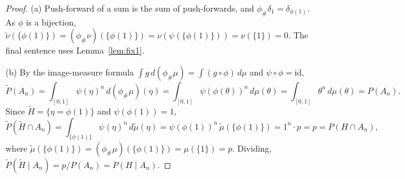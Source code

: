 \documentclass{amsart}
\theoremstyle{definition}
\begin{document}
\begin{proof}
(a) Push-forward of a sum is the sum of push-forwards, and
$\phi_\#\delta_1=\delta_{\phi(1)}$. As $\phi$ is a bijection,
$\tilde\nu(\{\phi(1)\})=(\phi_\#\nu)(\{\phi(1)\})=\nu(\psi(\{\phi(1)\}))
=\nu(\{1\})=0$. The final sentence uses Lemma~\ref{lem:fix1}.

(b) By the image-measure formula $\int g\,d(\phi_\#\mu)=\int(g\circ\phi)\,d\mu$
and $\psi\circ\phi=\mathrm{id}$,
\[
  \tilde P(A_n)=\int_{[0,1]}\psi(\eta)^n\,d(\phi_\#\mu)(\eta)
  =\int_{[0,1]}\psi(\phi(\theta))^n\,d\mu(\theta)
  =\int_{[0,1]}\theta^n\,d\mu(\theta)=P(A_n).
\]
Since $\tilde H=\{\eta=\phi(1)\}$ and $\psi(\phi(1))=1$,
\[
  \tilde P(\tilde H\cap A_n)=\int_{\{\phi(1)\}}\psi(\eta)^n\,d\tilde\mu(\eta)
  =\psi(\phi(1))^n\,\tilde\mu(\{\phi(1)\})=1^n\cdot p=p=P(H\cap A_n),
\]
where $\tilde\mu(\{\phi(1)\})=(\phi_\#\mu)(\{\phi(1)\})=\mu(\{1\})=p$. Dividing,
$\tilde P(\tilde H\mid A_n)=p/P(A_n)=P(H\mid A_n)$.
\end{proof}
\end{document}
